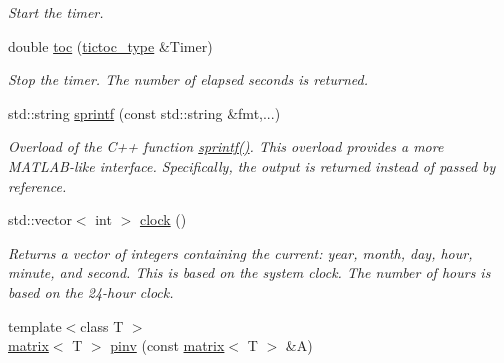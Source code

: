 \begin{DoxyCompactItemize}
\begin{DoxyCompactList}\small\item\em Start the timer. \end{DoxyCompactList}\item 
\hypertarget{namespacekeycpp_afe03fbbb5126729fb4b9367097acb1d1}{double \hyperlink{namespacekeycpp_afe03fbbb5126729fb4b9367097acb1d1}{toc} (\hyperlink{structkeycpp_1_1tictoc__type}{tictoc\-\_\-type} \&Timer)}\label{namespacekeycpp_afe03fbbb5126729fb4b9367097acb1d1}

\begin{DoxyCompactList}\small\item\em Stop the timer. The number of elapsed seconds is returned. \end{DoxyCompactList}\item 
\hypertarget{namespacekeycpp_a9d70a761d33bbc2bdec6b4e0eb43d517}{std\-::string \hyperlink{namespacekeycpp_a9d70a761d33bbc2bdec6b4e0eb43d517}{sprintf} (const std\-::string \&fmt,...)}\label{namespacekeycpp_a9d70a761d33bbc2bdec6b4e0eb43d517}

\begin{DoxyCompactList}\small\item\em Overload of the C++ function \hyperlink{namespacekeycpp_a9d70a761d33bbc2bdec6b4e0eb43d517}{sprintf()}. This overload provides a more M\-A\-T\-L\-A\-B-\/like interface. Specifically, the output is returned instead of passed by reference. \end{DoxyCompactList}\item 
\hypertarget{namespacekeycpp_aff2feefaeb946dd453d74ff51c66fe67}{std\-::vector$<$ int $>$ \hyperlink{namespacekeycpp_aff2feefaeb946dd453d74ff51c66fe67}{clock} ()}\label{namespacekeycpp_aff2feefaeb946dd453d74ff51c66fe67}

\begin{DoxyCompactList}\small\item\em Returns a vector of integers containing the current\-: year, month, day, hour, minute, and second. This is based on the system clock. The number of hours is based on the 24-\/hour clock. \end{DoxyCompactList}\item 
\hypertarget{namespacekeycpp_ac20bd2ef4fb18cbcdb0f462a89447bd7}{{\footnotesize template$<$class T $>$ }\\\hyperlink{classkeycpp_1_1matrix}{matrix}$<$ T $>$ \hyperlink{namespacekeycpp_ac20bd2ef4fb18cbcdb0f462a89447bd7}{pinv} (const \hyperlink{classkeycpp_1_1matrix}{matrix}$<$ T $>$ \&A)}\label{namespacekeycpp_ac20bd2ef4fb18cbcdb0f462a89447bd7}


\end{DoxyCompactItemize}
